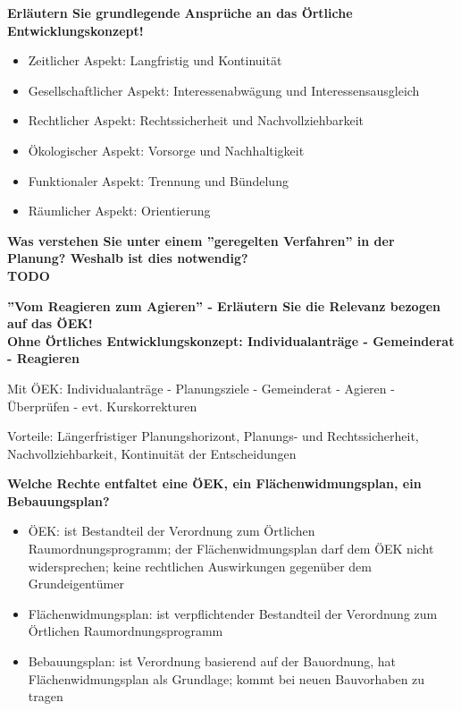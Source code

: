\documentclass[]{article}
\newenvironment{question}{\vspace{8mm}\noindent\bfseries}{\\}
\begin{document}
\begin{question}
	Erläutern Sie grundlegende Ansprüche an das Örtliche Entwicklungskonzept!
\end{question}
\begin{itemize}
	\item Zeitlicher Aspekt: Langfristig und Kontinuität
	\item Gesellschaftlicher Aspekt: Interessenabwägung und Interessensausgleich
	\item Rechtlicher Aspekt: Rechtssicherheit und Nachvollziehbarkeit
	\item Ökologischer Aspekt: Vorsorge und Nachhaltigkeit
	\item Funktionaler Aspekt: Trennung und Bündelung
	\item Räumlicher Aspekt: Orientierung
\end{itemize}
	

\begin{question}
	Was verstehen Sie unter einem ''geregelten Verfahren'' in der Planung? Weshalb ist dies notwendig?
\end{question}
TODO


\begin{question}
	''Vom Reagieren zum Agieren'' - Erläutern Sie die Relevanz bezogen auf das ÖEK!
\end{question}
Ohne Örtliches Entwicklungskonzept: Individualanträge - Gemeinderat - Reagieren

Mit ÖEK: Individualanträge - Planungsziele - Gemeinderat - Agieren - Überprüfen - evt. Kurskorrekturen

Vorteile: Längerfristiger Planungshorizont, Planungs- und Rechtssicherheit, Nachvollziehbarkeit, Kontinuität der Entscheidungen

\begin{question}
	Welche Rechte entfaltet eine ÖEK, ein Flächenwidmungsplan, ein Bebauungsplan?
\end{question}
\begin{itemize}
	\item ÖEK: ist Bestandteil der Verordnung zum Örtlichen Raumordnungsprogramm; der Flächenwidmungsplan darf dem ÖEK nicht widersprechen; keine rechtlichen Auswirkungen gegenüber dem Grundeigentümer
	\item Flächenwidmungsplan: ist verpflichtender Bestandteil der Verordnung zum Örtlichen Raumordnungsprogramm
	\item Bebauungsplan: ist Verordnung basierend auf der Bauordnung, hat Flächenwidmungsplan als Grundlage; kommt bei neuen Bauvorhaben zu tragen
\end{itemize}
\end{document}
